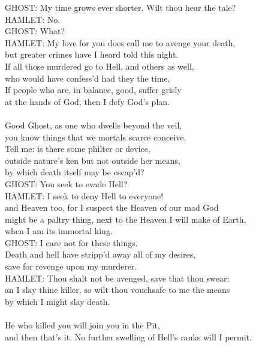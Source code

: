 \begin{playdialog}
GHOST: My time grows ever shorter. Wilt thou hear the tale?\\

HAMLET: No.\\

GHOST: What?\\

HAMLET: My love for you does call me to avenge your death,\\ but greater crimes have I heard told this night.\\ If all those murdered go to Hell, and others as well,\\ who would have confess’d had they the time,\\ If people who are, in balance, good, suffer grisly\\ at the hands of God, then I defy God’s plan.\\ \\ Good Ghost, as one who dwells beyond the veil,\\ you know things that we mortals scarce conceive.\\ Tell me: is there some philter or device,\\ outside nature’s ken but not outside her means,\\ by which death itself may be escap’d?\\

GHOST: You seek to evade Hell?\\

HAMLET: I seek to deny Hell to everyone!\\
and Heaven too, for I suspect the Heaven of our mad God\\
might be a paltry thing, next to the Heaven I will make of Earth,\\ when I am its immortal king.\\

GHOST: I care not for these things.\\
Death and hell have stripp’d away all of my desires,\\
save for revenge upon my murderer.\\

HAMLET: Thou shalt not be avenged, save that thou swear:\\
an I slay thine killer, so wilt thou vouchsafe to me the means\\
by which I might slay death.\\
\\
He who killed you will join you in the Pit,\\
and then that’s it. No further swelling of Hell’s ranks will I permit.\\


\end{playdialog}
